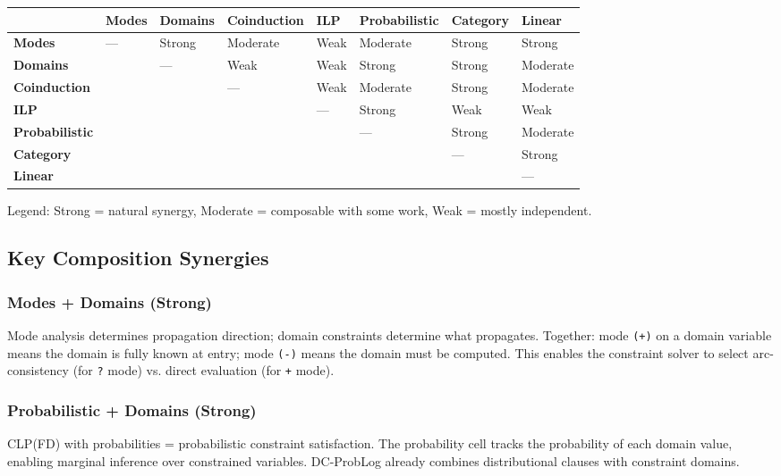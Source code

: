 \documentclass[11pt]{article}
\begin{document}
\begin{center}
\begin{tabular}{llllllll}
 & Modes & Domains & Coinduction & ILP & Probabilistic & Category & Linear\\
\hline
\textbf{Modes} & --- & Strong & Moderate & Weak & Moderate & Strong & Strong\\
\textbf{Domains} &  & --- & Weak & Weak & Strong & Strong & Moderate\\
\textbf{Coinduction} &  &  & --- & Weak & Moderate & Strong & Moderate\\
\textbf{ILP} &  &  &  & --- & Strong & Weak & Weak\\
\textbf{Probabilistic} &  &  &  &  & --- & Strong & Moderate\\
\textbf{Category} &  &  &  &  &  & --- & Strong\\
\textbf{Linear} &  &  &  &  &  &  & ---\\
\end{tabular}
\end{center}

Legend: Strong = natural synergy, Moderate = composable with some work, Weak = mostly independent.
\subsection{Key Composition Synergies}
\label{sec:org3505d37}

\subsubsection{Modes + Domains (Strong)}
\label{sec:org2ab4411}

Mode analysis determines propagation direction; domain constraints determine
what propagates. Together: mode \texttt{(+)} on a domain variable means the domain
is fully known at entry; mode \texttt{(-)} means the domain must be computed.
This enables the constraint solver to select arc-consistency (for \texttt{?} mode)
vs. direct evaluation (for \texttt{+} mode).
\subsubsection{Probabilistic + Domains (Strong)}
\label{sec:orga1a9090}

CLP(FD) with probabilities = probabilistic constraint satisfaction. The
probability cell tracks the probability of each domain value, enabling
marginal inference over constrained variables. DC-ProbLog already combines
distributional clauses with constraint domains.
\end{document}
